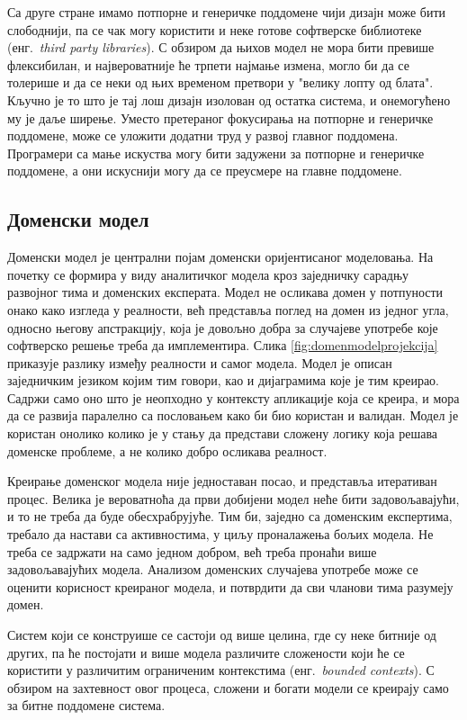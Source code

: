 \documentclass[12pt,oneside]{memoir}
\begin{document}
Са друге стране имамо потпорне и генеричке поддомене чији дизајн може бити слободнији, па се чак могу користити и неке готове софтверске библиотеке (енг.~\textit{third party libraries}). С обзиром да њихов модел не мора бити превише флексибилан, и највероватније ће трпети најмање измена, могло би да се толерише и да се неки од њих временом претвори у "велику лопту од блата". Кључно је то што је тај лош дизајн изолован од остатка система, и онемогућено му је даље ширење. Уместо претераног фокусирања на потпорне и генеричке поддомене, може се уложити додатни труд у развој главног поддомена. Програмери са мање искуства могу бити задужени за потпорне и генеричке поддомене, а они искуснији могу да се преусмере на главне поддомене.

\subsection{Доменски модел}
Доменски модел је централни појам доменски оријентисаног моделовања. На почетку се формира у виду аналитичког модела кроз заједничку сарадњу развојног тима и доменских експерата. Модел не осликава домен у потпуности онако како изгледа у реалности, већ представља поглед на домен из једног угла, односно његову апстракцију, која је довољно добра за случајеве употребе које софтверско решење треба да имплементира. Слика \ref{fig:domenmodelprojekcija} приказује разлику између реалности и самог модела. Модел је описан заједничким језиком којим тим говори, као и дијаграмима које је тим креирао. Садржи само оно што је неопходно у контексту апликације која се креира, и мора да се развија паралелно са пословањем како би био користан и валидан. Модел је користан онолико колико је у стању да представи сложену логику која решава доменске проблеме, а не колико добро осликава реалност.

Креирање доменског модела није једноставан посао, и представља итеративан процес. Велика је вероватноћа да први добијени модел неће бити задовољавајући, и то не треба да буде обесхрабрујуће. Тим би, заједно са доменским експертима, требало да настави са активностима, у циљу проналажења бољих модела. Не треба се задржати на само једном добром, већ треба пронаћи више задовољавајућих модела. Анализом доменских случајева употребе може се оценити корисност креираног модела, и потврдити да сви чланови тима разумеју домен.

Систем који се конструише се састоји од више целина, где су неке битније од других, па ће постојати и више модела различите сложености који ће се користити у различитим ограниченим контекстима (енг.~\textit{bounded contexts}). С обзиром на захтевност овог процеса, сложени и богати модели се креирају само за битне поддомене система. 
\end{document}

